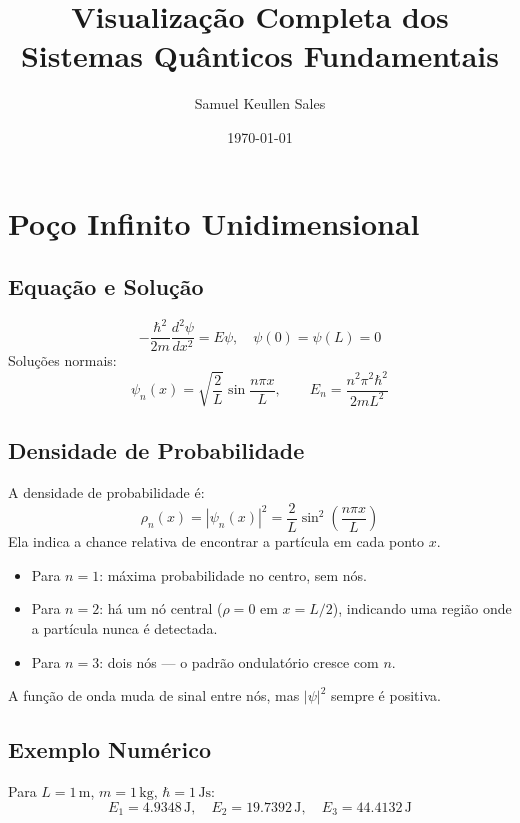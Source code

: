 \documentclass[12pt,a4paper]{article}
\title{Visualização Completa dos Sistemas Quânticos Fundamentais}
\author{Samuel Keullen Sales}
\date{\today}
\begin{document}
\maketitle

\tableofcontents
\newpage

\section{Poço Infinito Unidimensional}

\subsection*{Equação e Solução}

\[
-\frac{\hbar^2}{2m}\frac{d^2\psi}{dx^2}=E\psi, \quad \psi(0)=\psi(L)=0
\]
Soluções normais:
\[
\psi_n(x)=\sqrt{\frac{2}{L}}\sin\frac{n\pi x}{L}, \qquad
E_n=\frac{n^2\pi^2\hbar^2}{2mL^2}
\]

\subsection*{Densidade de Probabilidade}

A densidade de probabilidade é:
\[
\rho_n(x)=|\psi_n(x)|^2 = \frac{2}{L}\sin^2\!\left(\frac{n\pi x}{L}\right)
\]
Ela indica a chance relativa de encontrar a partícula em cada ponto \(x\).  

\begin{itemize}
\item Para \(n=1\): máxima probabilidade no centro, sem nós.  
\item Para \(n=2\): há um nó central (\(\rho=0\) em \(x=L/2\)), indicando uma região onde a partícula nunca é detectada.  
\item Para \(n=3\): dois nós — o padrão ondulatório cresce com \(n\).
\end{itemize}

A função de onda muda de sinal entre nós, mas \(|\psi|^2\) sempre é positiva.

\subsection*{Exemplo Numérico}

Para \(L=1\,\mathrm{m}\), \(m=1\,\mathrm{kg}\), \(\hbar=1\,\mathrm{Js}\):
\[
E_1=4.9348\,\mathrm{J}, \quad E_2=19.7392\,\mathrm{J}, \quad E_3=44.4132\,\mathrm{J}
\]
\end{document}
